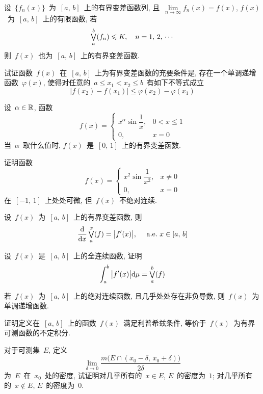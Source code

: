 \begin{problemset}
  \item 设~$\{f_n(x)\}$~为~$[a,\,b]$~上的有界变差函数列, 且~$\lim\limits_{n \to \infty} f_n(x) = f(x)$, $f(x)$~为~$[a,\,b]$~上的有限函数, 若
      \[
      \mathop{\textstyle{\bigvee}}_a^b (f_n) \leqslant K, \quad n =1,\,2,\,\cdots
      \]
      则~$f(x)$~也为~$[a,\,b]$~上的有界变差函数.

  \item 试证函数~$f(x)$~在~$[a,\,b]$~上为有界变差函数的充要条件是, 存在一个单调递增函数~$\varphi(x)$, 使得对任意的~$a \leqslant x_1 < x_2 \leqslant b$~有如下不等式成立
      \[
      \big| f(x_2) - f(x_1) \big| \leqslant \varphi(x_2) - \varphi(x_1)
      \]

  \item 设~$\alpha \in \mathbb{R}$, 函数
  \[
  f(x) = \left\{\!\!
  \begin{array}{cl}
  x^\alpha \sin \dfrac{1}{x}, & 0 < x \leqslant 1 \\[0.2cm]
  0, & x=0
  \end{array}
  \right.
  \]
  当~$\alpha$~取什么值时, $f(x)$~是~$[0,\,1]$~上的有界变差函数.

  \item 证明函数
  \[
  f(x) = \left\{\!\!
  \begin{array}{cl}
  x^2 \sin \dfrac{1}{x^2}, & x \neq 0 \\[0.2cm]
  0, & x=0
  \end{array}
  \right.
  \]
  在~$[-1,\,1]$~上处处可微, 但~$f(x)$~不绝对连续.

  \item 设~$f(x)$~为~$[a,\,b]$~上的有界变差函数, 则
  \[
  \frac{\mathrm{d}}{\mathrm{d} x} \mathop{\textstyle{\bigvee}}_a^x(f) = \big| f'(x) \big|, \quad  \mathrm{~a.e.~} x \in [a,\,b]
  \]

  \item 设~$f(x)$~是~$[a,\,b]$~上的全连续函数, 证明
  \[
  \int_a^b \big| f'(x) \big| \mathrm{d} \mu = \mathop{\textstyle{\bigvee}}_a^b(f)
  \]

  \item 若~$f(x)$~为~$[a,\,b]$~上的绝对连续函数, 且几乎处处存在非负导数, 则~$f(x)$~为单调递增函数.

  \item 证明定义在~$[a,\,b]$~上的函数~$f(x)$~满足利普希兹条件, 等价于~$f(x)$~为有界可测函数的不定积分. 

  \item 对于可测集~$E$, 定义
  \[
  \lim_{\delta \to 0} \frac{m\big(E \cap (x_0-\delta,\,x_0+\delta) \big)} {2\delta}
  \]
  为~$E$~在~$x_0$~处的密度, 试证明对几乎所有的~$x \in E$, $E$~的密度为~$1$; 对几乎所有的~$x \notin E$, $E$~的密度为~$0$.
\end{problemset}